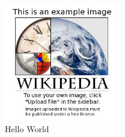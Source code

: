 \begin{figure}
\includegraphics[width=2in]{img/Example.jpg}
\caption{Hello World}
\label{fig:example}
\end{figure}